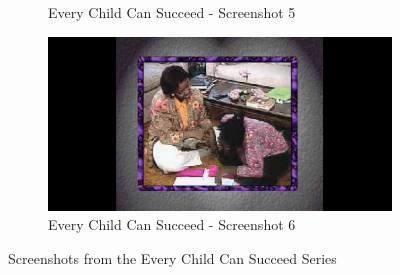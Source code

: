 \begin{figure}[H]
\begin{subfigure}{0.45\textwidth}
        \caption{Every Child Can Succeed - Screenshot 5}
    \end{subfigure}
    \begin{subfigure}{0.45\textwidth}
        \centering
        \includegraphics[width=\linewidth]{Games/EveryChildCanSucceed/Images/EveryChildCanSucceedScreenshot6.jpg}
        \caption{Every Child Can Succeed - Screenshot 6}
    \end{subfigure}
    \caption{Screenshots from the Every Child Can Succeed Series}
\end{figure}
